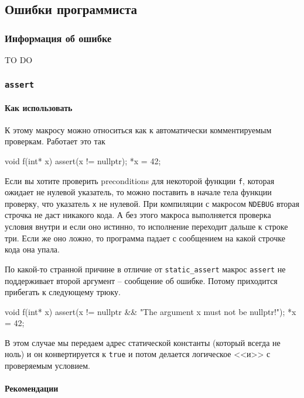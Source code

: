 \subsection{Ошибки программиста}

\subsubsection{Информация об ошибке}
TO DO

\subsubsection{\texttt{assert}}

\paragraph{Как использовать}

К этому макросу можно относиться как к автоматически комментируемым проверкам.
Работает это так
\begin{cppcode}
void f(int* x) {
  assert(x != nullptr);
  *x = 42;
}
\end{cppcode}
Если вы хотите проверить preconditions для некоторой функции \verb"f", которая ожидает не нулевой указатель, то можно поставить в начале тела функции проверку, что указатель \verb"x" не нулевой.
При компиляции с макросом \verb"NDEBUG" вторая строчка не даст никакого кода.
А без этого макроса выполняется проверка условия внутри и если оно истинно, то исполнение переходит дальше к строке три.
Если же оно ложно, то программа падает с сообщением на какой строчке кода она упала.

По какой-то странной причине в отличие от \verb"static_assert" макрос \verb"assert" не поддерживает второй аргумент -- сообщение об ошибке.
Потому приходится прибегать к следующему трюку.
\begin{cppcode}
void f(int* x) {
  assert(x != nullptr && "The argument x must not be nullptr!");
  *x = 42;
}
\end{cppcode}
В этом случае мы передаем адрес статической константы (который всегда не ноль) и он конвертируется к \verb"true" и потом делается логическое <<и>> с проверяемым условием.

\paragraph{Рекомендации}

